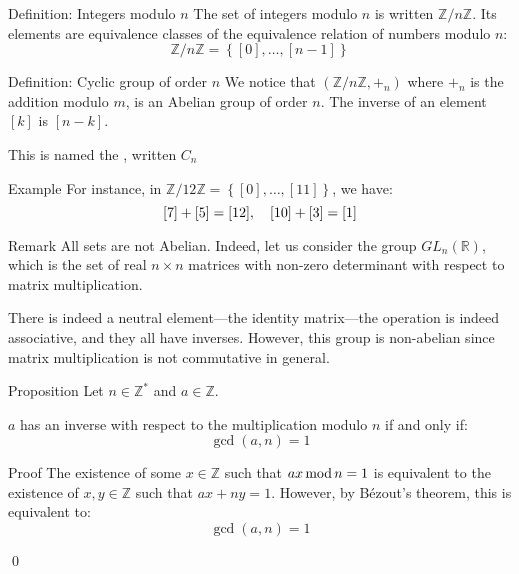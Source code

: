 \documentclass[a4paper]{article}
\begin{document}
\begin{parag}{Definition: Integers modulo $n$}
    The set of integers modulo $n$ is written $\mathbb{Z} / n\mathbb{Z}$. Its elements are equivalence classes of the equivalence relation of numbers modulo $n$: 
    \[\mathbb{Z} / n \mathbb{Z} = \left\{\left[0\right], \ldots, \left[n-1\right]\right\}\]
\end{parag}

\begin{parag}{Definition: Cyclic group of order $n$}
    We notice that $\left(\mathbb{Z} / n\mathbb{Z}, +_n\right)$ where $+_n$ is the addition modulo $m$, is an Abelian group of order $n$. The inverse of an element $\left[k\right]$ is $\left[n-k\right]$.

    This is named the , written $C_n$

    \begin{subparag}{Example}
        For instance, in $\mathbb{Z} / 12 \mathbb{Z} = \left\{\left[0\right], \ldots, \left[11\right]\right\}$, we have: 
        \[\left[7\right] + \left[5\right] = \left[12\right], \mathspace \left[10\right] + \left[3\right] = \left[1\right]\]
    \end{subparag}
\end{parag}

\begin{parag}{Remark}
    All sets are not Abelian. Indeed, let us consider the group $GL_{n}\left(\mathbb{R}\right)$, which is the set of real $n \times n$ matrices with non-zero determinant with respect to matrix multiplication.

    There is indeed a neutral element---the identity matrix---the operation is indeed associative, and they all have inverses. However, this group is non-abelian since matrix multiplication is not commutative in general. 
\end{parag}

\begin{parag}{Proposition}
    Let $n \in \mathbb{Z}^*$ and $a \in \mathbb{Z}$. 

    $a$ has an inverse with respect to the multiplication modulo $n$ if and only if: 
    \[\gcd\left(a, n\right) = 1\]
    
    \begin{subparag}{Proof}
        The existence of some $x \in \mathbb{Z}$ such that $ax \operatorname{mod} n = 1$ is equivalent to the existence of $x, y \in \mathbb{Z}$ such that $ax + ny = 1$. However, by Bézout's theorem, this is equivalent to: 
        \[\gcd\left(a, n\right) = 1\]

        \qed
    \end{subparag}
\end{parag}
\end{document}
